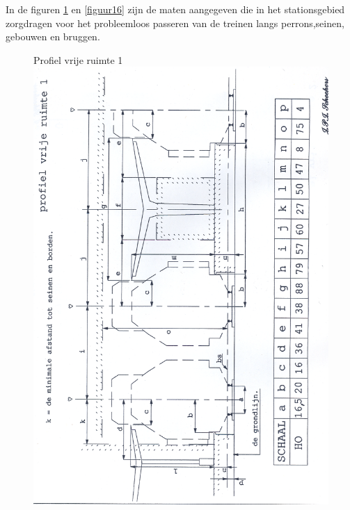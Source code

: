 \documentclass[12pt,a4paper]{report}
\begin{document}
In de figuren \ref{figuur15} en \ref{figuur16} zijn de maten aangegeven die in het stationsgebied zorgdragen voor het probleemloos passeren van de treinen langs perrons,seinen, gebouwen en bruggen.

\begin{figure}[ht]
  \captionbox
  {Profiel vrije ruimte 1\label{figuur15}}
  {\includegraphics[scale=0.9]{images/rcu_figuur15}}
\end{figure}
\end{document}
